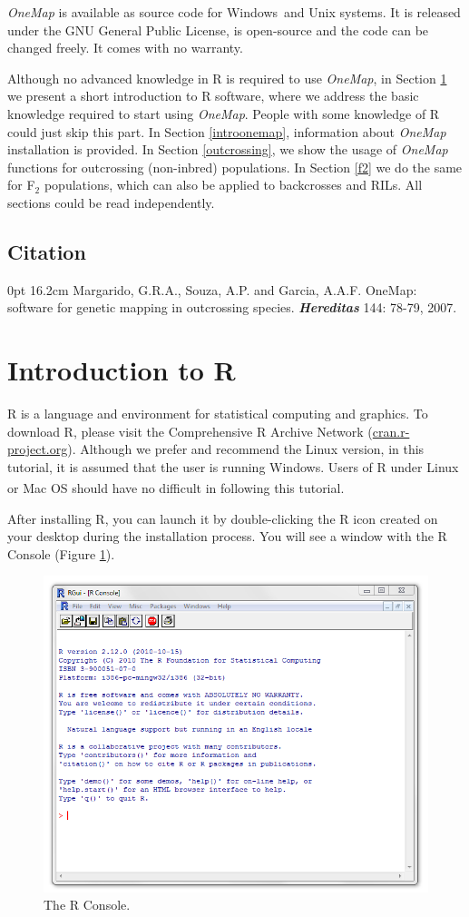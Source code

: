 \documentclass[letterpaper,12pt,oneside]{article}
\begin{document}
{\sl OneMap} is available as source code for Windows\texttrademark \ and Unix systems. It is released under the GNU General Public License, is open-source and the code can be changed freely. It comes with no warranty. 

Although no advanced knowledge in R is required to use {\sl OneMap}, in Section \ref{introductiontor} we present a short introduction to R software, where we address the basic knowledge required to start using {\sl OneMap}. People with some knowledge of R could just skip this part. In Section \ref{introonemap}, information about  {\sl OneMap} installation is provided. In Section \ref{outcrossing}, we show the usage of {\sl OneMap} functions for outcrossing (non-inbred) populations. In Section \ref{f2} we do the same for F$_2$ populations, which can also be applied to backcrosses and RILs. All sections could be read independently. 

\subsection{Citation}

 0pt \linewidth 0.8cm 16.2cm
Margarido, G.R.A., Souza, A.P. and Garcia, A.A.F. OneMap: software for genetic mapping in outcrossing species. {\bf {\it Hereditas}} 144: 78-79, 2007.

\section{Introduction to R}
\label{introductiontor}

R is a language and environment for statistical computing and graphics. To download R, please visit the Comprehensive R Archive Network (\url{cran.r-project.org}). Although we prefer and recommend the Linux version, in this tutorial, it is assumed that the user is running Windows\texttrademark. Users of R under Linux or Mac\textsuperscript{\textregistered} OS should have no difficult in following this tutorial. 

After installing R, you can launch it by double-clicking the R icon created on your desktop during the installation process. You will see a window with the R Console (Figure \ref{rconsole}).

\begin{figure}[ht!]
  \centering
  \includegraphics[width=.7\textwidth]{figures/rconsole.png}
  \caption{The R Console.}
   \label{rconsole}
\end{figure}
\end{document}
